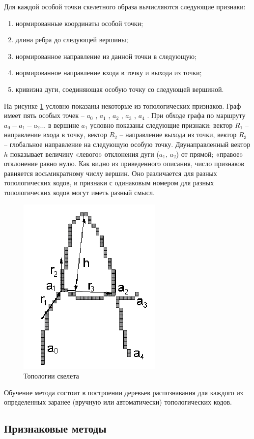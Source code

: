 Для каждой особой точки скелетного образа вычисляются следующие признаки:
\begin{enumerate}
\item нормированные координаты особой точки;
\item длина ребра до следующей вершины;
\item нормированное направление из данной точки в следующую;
\item нормированное направление входа в точку и выхода из точки;
\item кривизна дуги, соединяющая особую точку со следующей вершиной.
\end{enumerate}

На рисунке \ref{img_skelet_2} условно показаны некоторые из топологических признаков. Граф
имеет пять особых точек -- $a_0$ , $a_1$ , $a_2$ , $a_3$ , $a_4$ . При обходе графа по маршруту $a_0-a_1-a_2 ...$ в вершине $a_1$ условно показаны следующие признаки: вектор $R_1$ -- направление входа в точку, вектор $R_2$ -- направление выхода из точки, вектор $R_3$ -- глобальное направление
на следующую особую точку. Двунаправленный вектор $h$ показывает величину
«левого» отклонения дуги ($a_1$, $a_2$) от прямой; «правое» отклонение равно нулю.
Как видно из приведенного описания, число признаков равняется
восьмикратному числу вершин. Оно различается для разных топологических кодов, и
признаки с одинаковым номером для разных топологических кодов могут иметь
разный смысл.

\begin{figure}[h]
\centering
\includegraphics[width=0.25\linewidth,keepaspectratio]{images/intro_skelet_2}
\caption{Топологии скелета}
\label{img_skelet_2}
\end{figure}

Обучение метода состоит в построении деревьев распознавания для каждого из
определенных заранее (вручную или автоматически) топологических кодов.

\subsection{Признаковые методы}

